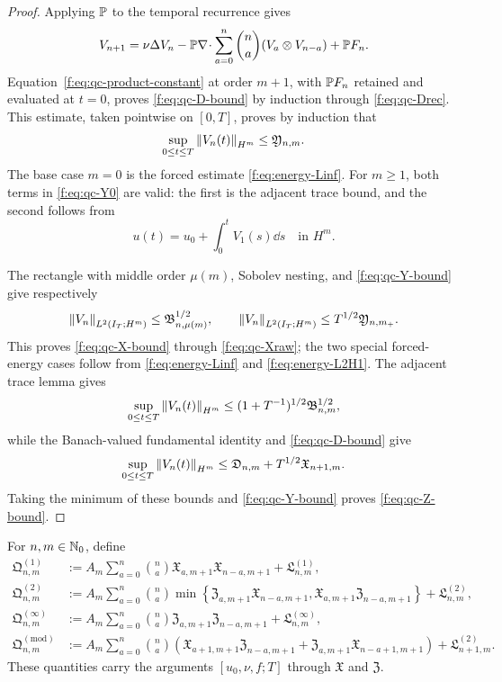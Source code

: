 \begin{proof}
Applying \(\mathbb P\) to the temporal recurrence gives
\begin{equation}
 V_{n+1}=\nu\Delta V_n
 -\mathbb P\nabla\!\cdot\sum_{a=0}^{n}\binom na
 (V_a\otimes V_{n-a})+\mathbb P F_n.
 \label{f:eq:qc-projected-temporal-recurrence}
\end{equation}
Equation~\eqref{f:eq:qc-product-constant} at order \(m+1\), with
\(\mathbb P F_n\) retained and evaluated at
\(t=0\), proves \eqref{f:eq:qc-D-bound} by induction through
\eqref{f:eq:qc-Drec}.  This estimate, taken pointwise on \([0,T]\),
proves by induction that
\begin{equation}
 \sup_{0\le t\le T}\left\lVert V_n(t)\right\rVert_{H^m}
 \le\mathfrak Y_{n,m}.
 \label{f:eq:qc-Y-bound}
\end{equation}
The base case \(m=0\) is the forced estimate \eqref{f:eq:energy-Linf}.  For \(m\ge1\), both
terms in \eqref{f:eq:qc-Y0} are valid: the first is the adjacent trace bound,
and the second follows from
\[
 u(t)=u_0+\int_0^tV_1(s)\dd s
 \quad\text{in }H^m.
\]

The rectangle with middle order \(\mu(m)\), Sobolev nesting, and
\eqref{f:eq:qc-Y-bound} give respectively
\[
 \left\lVert V_n\right\rVert_{L^2(I_T;H^m)}
 \le\mathfrak B_{n,\mu(m)}^{1/2},
 \qquad
 \left\lVert V_n\right\rVert_{L^2(I_T;H^m)}
 \le T^{1/2}\mathfrak Y_{n,m_+}.
\]
This proves \eqref{f:eq:qc-X-bound} through \eqref{f:eq:qc-Xraw}; the two
special forced-energy cases follow from \eqref{f:eq:energy-Linf} and
\eqref{f:eq:energy-L2H1}.  The adjacent trace lemma gives
\[
 \sup_{0\le t\le T}\left\lVert V_n(t)\right\rVert_{H^m}
 \le(1+T^{-1})^{1/2}\mathfrak B_{n,m}^{1/2},
\]
while the Banach-valued fundamental identity and
\eqref{f:eq:qc-D-bound} give
\[
 \sup_{0\le t\le T}\left\lVert V_n(t)\right\rVert_{H^m}
 \le\mathfrak D_{n,m}+T^{1/2}\mathfrak X_{n+1,m}.
\]
Taking the minimum of these bounds and \eqref{f:eq:qc-Y-bound} proves
\eqref{f:eq:qc-Z-bound}.
\end{proof}

\begin{definition}
\label{f:def:qc-closed-pressure-majorants}
For \(n,m\in\mathbb N_0\), define
\begin{align}
 \mathfrak Q^{(1)}_{n,m}
 &:={}
 A_m\sum_{a=0}^{n}\binom na
 \mathfrak X_{a,m+1}\mathfrak X_{n-a,m+1}
 +\mathfrak L^{(1)}_{n,m},
 \label{f:eq:qc-Q1}\\
 \mathfrak Q^{(2)}_{n,m}
 &:={}
 A_m\sum_{a=0}^{n}\binom na
 \min\left\{
 \mathfrak Z_{a,m+1}\mathfrak X_{n-a,m+1},
 \mathfrak X_{a,m+1}\mathfrak Z_{n-a,m+1}
 \right\}
 +\mathfrak L^{(2)}_{n,m},
 \label{f:eq:qc-Q2}\\
 \mathfrak Q^{(\infty)}_{n,m}
 &:={}
 A_m\sum_{a=0}^{n}\binom na
 \mathfrak Z_{a,m+1}\mathfrak Z_{n-a,m+1}
 +\mathfrak L^{(\infty)}_{n,m},
 \label{f:eq:qc-Qinfty}\\
 \mathfrak Q^{(\mathrm{mod})}_{n,m}
 &:={}
 A_m\sum_{a=0}^{n}\binom na
 \left(
 \mathfrak X_{a+1,m+1}\mathfrak Z_{n-a,m+1}
 +\mathfrak Z_{a,m+1}\mathfrak X_{n-a+1,m+1}
 \right)
 +\mathfrak L^{(2)}_{n+1,m}.
 \label{f:eq:qc-Qmod}
\end{align}
These quantities carry the arguments \([u_0,\nu,f;T]\) through
\(\mathfrak X\) and \(\mathfrak Z\).
\end{definition}

